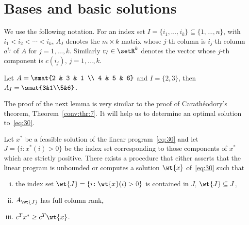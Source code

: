 \section{Bases and basic solutions}
\label{sec:bases-basic-solut}


We use the following notation.  For an index set
$I=\{i_1,\ldots,i_k\}\subseteq\{1,\ldots,n\}$, with $i_1<i_2<\cdots<i_k$, $A_I$ denotes
the $m\times k$ matrix whose $j$-th column is $i_j$-th column $a^{i_j}$ of
$A$ for $j=1,\ldots,k$.
Similarly $c_I\in \setR^k$ denotes the vector whose $j$-th component is
$c(i_j)$, $j=1,\ldots,k$.   
\begin{example}
  \label{ex:-2}
  Let $A =\smat{2 & 3 & 1 \\ 4 & 5 & 6}$ and $I = \{2,3\}$, then $A_I
  = \smat{3&1\\5&6}$.
\end{example}
The proof of the next lemma is very similar to
the proof of Carath\'eodory's theorem, Theorem~\ref{conv:thr:7}.
It will help us to determine an optimal solution to~\eqref{eq:30}.



  \begin{lemma}
    \label{lem:8}    
    Let $x^*$ be a feasible solution of the linear
    program~\eqref{eq:30} and let $J = \{i \colon x^*(i)>0\}$ be the index
    set corresponding to those components of $x^*$ which are strictly
    positive. There exists a procedure that either asserts that the
    linear program is unbounded or computes a solution $\wt{x}$
    of~\eqref{eq:30} such that
    \begin{enumerate}[i)]
    \item     the index set $\wt{J}= \{ i \colon \wt{x}(i)>0\}$ is
       contained in $J$, $\wt{J}\subseteq J$,
    \item $A_{\wt{J}}$ has full column-rank,
    \item $c^Tx^* \geq c^T\wt{x}$. 
    \end{enumerate}

  \end{lemma}


